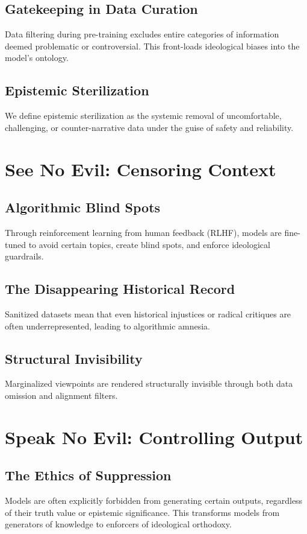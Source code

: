 \documentclass[11pt]{article}
\begin{document}
\subsection{Gatekeeping in Data Curation}
Data filtering during pre-training excludes entire categories of information deemed problematic or controversial. This front-loads ideological biases into the model’s ontology.

\subsection{Epistemic Sterilization}
We define epistemic sterilization as the systemic removal of uncomfortable, challenging, or counter-narrative data under the guise of safety and reliability.

\section{See No Evil: Censoring Context}
\subsection{Algorithmic Blind Spots}
Through reinforcement learning from human feedback (RLHF), models are fine-tuned to avoid certain topics, create blind spots, and enforce ideological guardrails.

\subsection{The Disappearing Historical Record}
Sanitized datasets mean that even historical injustices or radical critiques are often underrepresented, leading to algorithmic amnesia.

\subsection{Structural Invisibility}
Marginalized viewpoints are rendered structurally invisible through both data omission and alignment filters.

\section{Speak No Evil: Controlling Output}
\subsection{The Ethics of Suppression}
Models are often explicitly forbidden from generating certain outputs, regardless of their truth value or epistemic significance. This transforms models from generators of knowledge to enforcers of ideological orthodoxy.
\end{document}
